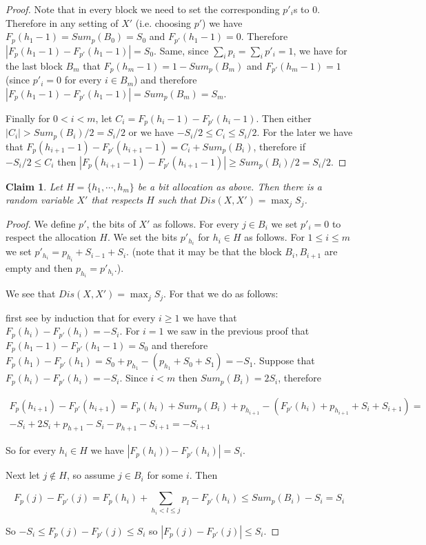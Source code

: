 \documentclass{article}
\newtheorem{claim}{Claim}
\begin{document}
\begin{proof}
	Note that in every block we need to set the corresponding $p'_i$s to $0$. Therefore in any setting of $X'$ (i.e. choosing $p'$) we have $F_p(h_1-1)=Sum_p(B_0)= S_0$ and $F_{p'}(h_1-1)=0$. Therefore $|F_p(h_1-1)-F_{p'}(h_1-1)|=S_0$. Same, since $\sum_ip_i = \sum_ip'_i=1$, we have for the last block $B_m$ that $F_p(h_m-1)=1-Sum_p(B_m)$ and $F_{p'}(h_m-1)=1$ (since $p'_i=0$ for every $i\in B_m$) and therefore $|F_p(h_1-1)-F_{p'}(h_1-1)|=Sum_p(B_m) = S_m$.
	
	Finally for $0<i<m$, let $C_i = F_p(h_i-1)-F_{p'}(h_i-1)$. Then either $|C_i|>Sum_p(B_i)/2=S_i/2$ or we have $-S_i/2\leq C_i \leq S_i/2$.
	For the later we have that $F_p(h_{i+1}-1)-F_{p'}(h_{i+1}-1)= C_i+Sum_p(B_i)$, therefore if $-S_i/2\leq C_i$ then $|F_p(h_{i+1}-1)-F_{p'}(h_{i+1}-1)|\geq Sum_p(B_i)/2=S_i/2$. 
\end{proof}

\begin{claim}\label{clm:eq}
	Let $H=\{h_1,\cdots,h_m\}$ be a bit allocation as above. Then there is a random variable $X'$ that respects $H$ such that $Dis(X,X')= \max_j S_j$. 
\end{claim}

\begin{proof}
	We define $p'$, the bits of $X'$ as follows. For every $j\in B_i$ we set $p'_i=0$ to respect the allocation $H$.
	We  set the bits $p'_{h_i}$ for $h_i\in H$ as follows. For $1\leq i\leq m$ we set $p'_{h_i}=p_{h_i}+S_{i-1}+S_i$. (note that it may be that the block $B_i,B_{i+1}$ are empty and then $p_{h_i}=p'_{h_i}$.).
	
	We see that $Dis(X,X')= \max_j S_j$. For that we do as follows:
	
	first see by induction that for every $i\geq 1$ we have that $F_p(h_{i})-F_{p'}(h_{i})= -S_{i}$. 
	For $i=1$ we saw in the previous proof that $F_p(h_1-1)-F_{p'}(h_1-1)=S_0$ and therefore  $F_p(h_1)-F_{p'}(h_1) = S_0+p_{h_1}-(p_{h_1}+S_0+S_1)=-S_1$. Suppose that $F_p(h_i)-F_{p'}(h_i)= -S_{i}$. 
	Since $i<m$ then $Sum_p(B_i)=2S_i$, therefore
	
	\begin{multline}
	F_p(h_{i+1})-F_{p'}(h_{i+1})=F_p(h_i)+Sum_p(B_i)+p_{h_{i+1}}-(F_{p'}(h_i)+p_{h_{i+1}}+S_{i}+S_{i+1}) =\\ -S_i+2S_i+p_{h+1}-S_i-p_{h+1}-S_{i+1} = -S_{i+1}
	\end{multline}
	
	
	
	
	So for every $h_i\in H$ we have $|F_p(h_{i}))-F_{p'}(h_{i})|= S_{i}$.
	
	Next let $j\not\in H$, so assume $j\in B_i$ for some $i$. Then 
	
	$$F_p(j)-F_{p'}(j) = F_p(h_i)+\sum_{h_i<l\leq j}p_l-F_{p'}(h_i) \leq Sum_p(B_i)-S_i = S_i$$
	
	So $-S_i\leq F_p(j)-F_{p'}(j)\leq S_i$ so $|F_p(j)-F_{p'}(j)|\leq S_i$. 
\end{proof}
\end{document}
